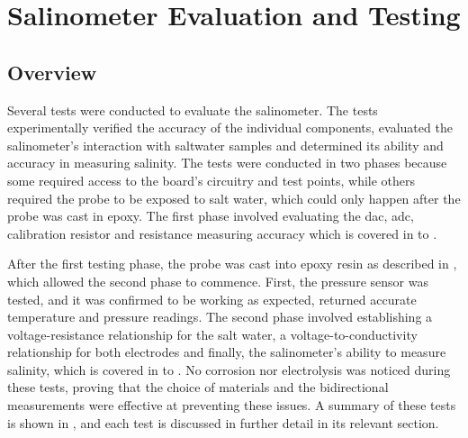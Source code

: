 
\chapter{Salinometer Evaluation and Testing}\label{ch:testing}

\section{Overview}

Several tests were conducted to evaluate the salinometer.
The tests experimentally verified the accuracy of the individual components, evaluated the salinometer's interaction with saltwater samples and determined its ability and accuracy in measuring salinity.
The tests were conducted in two phases because some required access to the board's circuitry and test points, while others required the probe to be exposed to salt water, which could only happen after the probe was cast in epoxy.
The first phase involved evaluating the \gls{dac}, \gls{adc}, calibration resistor and resistance measuring accuracy which is covered in  to .

After the first testing phase, the probe was cast into epoxy resin as described in , which allowed the second phase to commence.
First, the pressure sensor was tested, and it was confirmed to be working as expected, returned accurate temperature and pressure readings.
The second phase involved establishing a voltage-resistance relationship for the salt water, a voltage-to-conductivity relationship for both electrodes and finally, the salinometer's ability to measure salinity, which is covered in  to .
No corrosion nor electrolysis was noticed during these tests, proving that the choice of materials and the bidirectional measurements were effective at preventing these issues.
A summary of these tests is shown in , and each test is discussed in further detail in its relevant section.

